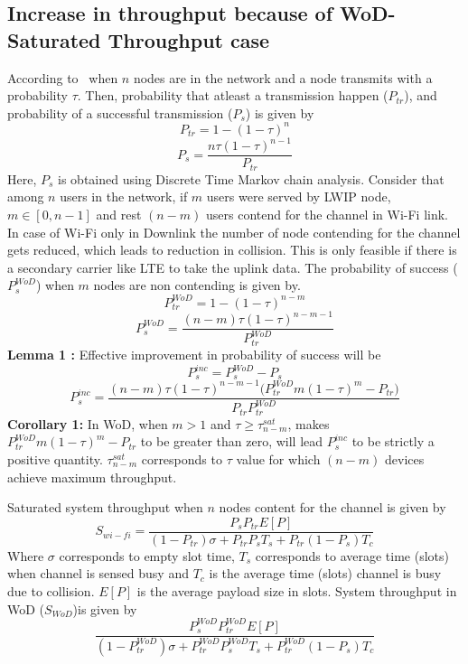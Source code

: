 \documentclass[conference]{IEEEtran}
\begin{document}
\subsection{Increase in throughput because of WoD-Saturated Throughput case}
According to~\cite{bianchi2000performance} when $n$ nodes are in the network and a node transmits with a probability $\tau$. Then, probability that atleast a transmission happen ($P_{tr}$), and probability of a successful transmission ($P_{s}$) is given by
\begin{equation}
P_{tr}=1-(1-\tau)^{n}
\end{equation}
\begin{equation}
P_{s}=\frac{n \tau (1-\tau)^{n-1}}{P_{tr}}
\end{equation}
Here, $P_{s}$ is obtained using Discrete Time Markov chain analysis. 
Consider that among $n$ users in the network, if $m$ users were served by LWIP node, $m \in [0,n-1]$ and rest $(n-m)$ users contend for the channel in Wi-Fi link. In case of Wi-Fi only in Downlink the number of node contending for the channel gets reduced, which leads to reduction in collision. This is only feasible if there is a secondary carrier like LTE to take the uplink data. The probability of success ($P_{s}^{WoD}$) when $m$ nodes are non contending is given by.
\begin{equation}
P^{WoD}_{tr}=1-(1-\tau)^{n-m}
\end{equation}
\begin{equation}
P^{WoD}_{s}=\frac{(n-m) \tau (1-\tau)^{n-m-1}}{P^{WoD}_{tr}}
\end{equation}
\textbf{Lemma 1 :} Effective improvement in probability of success will be
\begin{equation}
P_{s}^{inc}=P_{s}^{WoD}-P_{s}
\end{equation}
\begin{equation}
P^{inc}_{s}=\frac{(n-m)\tau(1-\tau)^{n-m-1}\big( P_{tr}^{WoD} m (1-\tau)^m -P_{tr}\big)}{P_{tr} P_{tr}^{WoD}}
\end{equation}
\textbf{Corollary 1:}
In WoD, when $m > 1$ and $\tau \geq \tau_{n-m}^{sat}$, makes $P_{tr}^{WoD} m (1-\tau)^m -P_{tr}$ to be greater than zero, will lead $P^{inc}_{s}$ to be strictly a positive quantity. $\tau_{n-m}^{sat}$ corresponds to $\tau$ value for which $(n-m)$ devices achieve maximum throughput.
\par Saturated system throughput when $n$ nodes content for the channel is given by
\begin{equation}
S_{wi-fi}=\frac{P_{s} P_{tr} E[P]}{(1-P_{tr})\sigma + P_{tr} P_{s} T_{s} + P_{tr}(1-P_{s})T_{c}}
\end{equation}
Where $\sigma$ corresponds to empty slot time, $T_{s}$ corresponds to average time (slots) when channel is sensed busy and $T_{c}$ is the average time (slots) channel is busy due to collision. $E[P]$ is the average payload size in slots. System throughput in WoD ($S_{WoD}$)is given by
\begin{equation}
\frac{P_{s}^{WoD} P_{tr}^{WoD} E[P]}{(1-P_{tr}^{WoD})\sigma + P_{tr}^{WoD} P_{s}^{WoD} T_{s} + P_{tr}^{WoD}(1-P_{s})T_{c}}
\end{equation}
\end{document}
